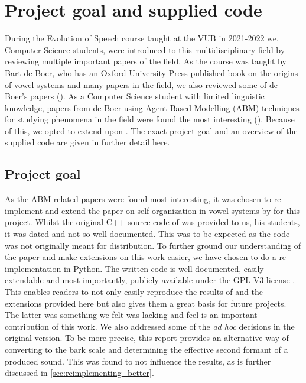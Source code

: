 \chapter{Project goal and supplied code}
\label{ch:general_remarks}

During the Evolution of Speech course taught at the VUB in 2021-2022 we, Computer Science students, were introduced to this multidisciplinary field by reviewing multiple important papers of the field.
As the course was taught by Bart de Boer, who has an Oxford  University Press published book on the origins of vowel systems and many papers in the field, we also reviewed some of de Boer's papers (\cite{deBoerBook, deBoer2000, deBoer2010, deBoer2018}).
As a Computer Science student with limited linguistic knowledge, papers from de Boer using Agent-Based Modelling (ABM) techniques for studying phenomena in the field were found the most interesting (\cite{deBoer2000, deBoer2010}).
Because of this, we opted to extend upon \citet{deBoer2000}.
The exact project goal and an overview of the supplied code are given in further detail here.


\section{Project goal}
\label{sec:general_remarks_why}
As the ABM related papers were found most interesting, it was chosen to re-implement and extend the paper on self-organization in vowel systems by \citet{deBoer2000} for this project.
Whilst the original C++ source code of \citet{deBoer2000} was provided to us, his students, it was dated and not so well documented.
This was to be expected as the code was not originally meant for distribution.
To further ground our understanding of the paper and make extensions on this work easier, we have chosen to do a re-implementation in Python.
The written code is well documented, easily extendable and most importantly, publicly available under the GPL V3 license \citep{gplv3, github_project}.
This enables readers to not only easily reproduce the results of \citet{deBoer2000} and the extensions provided here but also gives them a great basis for future projects.
The latter was something we felt was lacking and feel is an important contribution of this work.
We also addressed some of the \textit{ad hoc} decisions in the original version.
To be more precise, this report provides an alternative way of converting to the bark scale and determining the effective second formant of a produced sound.
This was found to not influence the results, as is further discussed in \ref{sec:reimplementing_better}.

